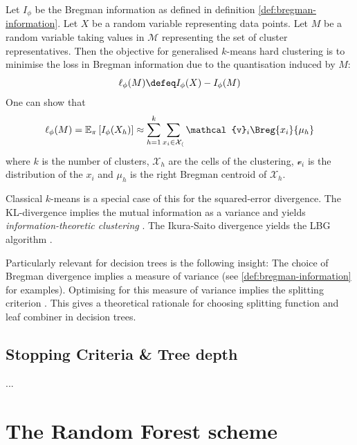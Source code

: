 \documentclass[../main.tex]{subfiles}
\begin{document}
Let $I_{\phi}$ be the Bregman information as defined in definition \ref{def:bregman-information}. Let $X$ be a random variable representing data points. Let $M$ be a random variable taking values in $\mathcal{M}$ representing the set of cluster representatives. Then the objective for generalised $k$-means hard clustering is to minimise the loss in Bregman information due to the quantisation induced by $M$:
$$
 \ell_{\phi}(M) \defeq I_{\phi}(X) - I_{\phi}(M)
$$
One can show \cite{banerjee} that
$$
\ell_{\phi}(M) = \mathbb{E}_{\pi}\left[ I_{\phi}(X_{h}) \right]  \approx \sum_{h=1}^k \sum_{x_{i} \in \mathcal{X_{h}}} \mathcal{v}_{i} \Breg{x_{i}}{\mu_{h}}
$$
where $k$ is the number of clusters, $\mathcal{X}_{h}$ are the cells of the clustering, $\mathcal{v}_{i}$ is the distribution of the $x_{i}$ and $\mu_{h}$ is the right Bregman centroid of $\mathcal{X}_{h}$.

Classical $k$-means is a special case of this for the squared-error divergence. The KL-divergence implies the mutual information as a variance and yields \textit{information-theoretic clustering} \cite{todo}. The Ikura-Saito divergence yields the LBG algorithm \cite{todo}.

Particularly relevant for decision trees is the following insight: The choice of Bregman divergence implies a measure of variance (see \ref{def:bregman-information} for examples). Optimising for this measure of variance implies the splitting criterion . This gives a theoretical rationale for choosing splitting function and leaf combiner in decision trees.

\subsection{Stopping Criteria \& Tree depth}

...


\section{The Random Forest scheme}


\end{document}
